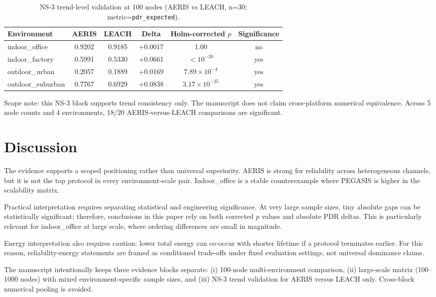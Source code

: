 \documentclass[sensors,article,submit,moreauthors,pdftex]{Definitions/mdpi}
\begin{document}
\begin{table}[H]
\caption{NS-3 trend-level validation at 100 nodes (AERIS vs LEACH, n=30; metric=\texttt{pdr\_expected}).}
\label{tab:ns3_trend}
\centering
\begin{tabular}{lccccc}
\toprule
Environment & AERIS & LEACH & Delta & Holm-corrected $p$ & Significance \\
\midrule
indoor\_office    & 0.9202 & 0.9185 & +0.0017 & 1.00 & no \\
indoor\_factory   & 0.5991 & 0.5330 & +0.0661 & $<10^{-20}$ & yes \\
outdoor\_urban    & 0.2057 & 0.1889 & +0.0169 & $7.89\times10^{-4}$ & yes \\
outdoor\_suburban & 0.7767 & 0.6929 & +0.0838 & $3.17\times10^{-25}$ & yes \\
\bottomrule
\end{tabular}
\end{table}

Scope note: this NS-3 block supports trend consistency only. The manuscript does not claim cross-platform numerical equivalence. Across 5 node counts and 4 environments, 18/20 AERIS-versus-LEACH comparisons are significant.

\section{Discussion}
The evidence supports a scoped positioning rather than universal superiority. AERIS is strong for reliability across heterogeneous channels, but it is not the top protocol in every environment-scale pair. Indoor\_office is a stable counterexample where PEGASIS is higher in the scalability matrix.

Practical interpretation requires separating statistical and engineering significance. At very large sample sizes, tiny absolute gaps can be statistically significant; therefore, conclusions in this paper rely on both corrected $p$ values and absolute PDR deltas. This is particularly relevant for indoor\_office at large scale, where ordering differences are small in magnitude.

Energy interpretation also requires caution: lower total energy can co-occur with shorter lifetime if a protocol terminates earlier. For this reason, reliability-energy statements are framed as conditioned trade-offs under fixed evaluation settings, not universal dominance claims.

The manuscript intentionally keeps three evidence blocks separate: (i) 100-node multi-environment comparison, (ii) large-scale matrix (100--1000 nodes) with mixed environment-specific sample sizes, and (iii) NS-3 trend validation for AERIS versus LEACH only. Cross-block numerical pooling is avoided.
\end{document}
